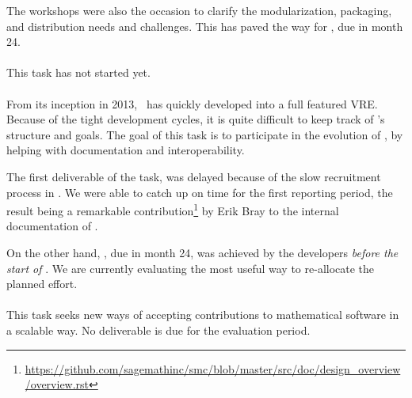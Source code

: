\documentclass{deliverablereport}
\begin{document}
  The workshops were also the occasion to clarify the modularization,
  packaging, and distribution needs and challenges. This has paved the
  way for , due
  in month 24.
  
  \paragraph{}
  \TODO{}
  
  \paragraph{}
  This task has not started yet.

  \paragraph{}
  \label{component-architecture@extract-smc}
  From its inception in 2013, \SMC\ has quickly developed into a full
  featured VRE.  Because of the tight
  development cycles, it is quite difficult to keep track of \SMC's
  structure and goals.  The goal of this task is to participate in the
  evolution of \SMC, by helping with documentation and
  interoperability.

  The first deliverable of the task,
   was delayed
  because of the slow recruitment process in . We were able
  to catch up on time for the first reporting period, the result being
  a remarkable
  contribution\footnote{\url{https://github.com/sagemathinc/smc/blob/master/src/doc/design_overview/overview.rst}}
  by Erik Bray to the internal documentation of \SMC.
  
  On the other hand,
  , due in month
  24, was achieved by the \SMC developers \emph{before the start of
    \ODK}. We are currently evaluating the most useful way to
  re-allocate the planned effort.
  
  \paragraph{}
  This task seeks new ways of accepting contributions to mathematical
  software in a scalable way.  No deliverable is due for the
  evaluation period.
  
\end{document}
